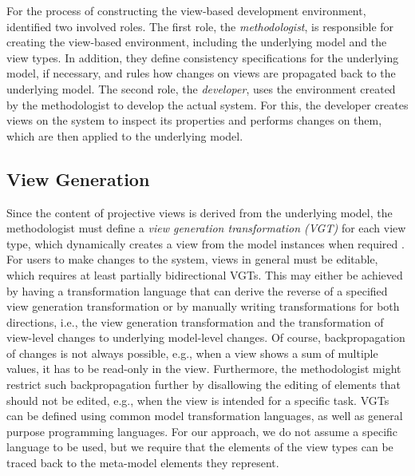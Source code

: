 For the process of constructing the view-based development environment, \textcite{atkinson_orthographic_2010} identified two involved roles.
The first role, the \emph{methodologist}, is responsible for creating the view-based environment, including the underlying model and the view types.
In addition, they define consistency specifications for the underlying model, if necessary, and rules how changes on views are propagated back to the underlying model.
The second role, the \emph{developer}, uses the environment created by the methodologist to develop the actual system.
For this, the developer creates views on the system to inspect its properties and performs changes on them, which are then applied to the underlying model.

\subsection{View Generation}
\label{sec:ViewGeneration}

Since the content of projective views is derived from the underlying model, the methodologist must define a \emph{view generation transformation (VGT)} for each view type, which dynamically creates a view from the model instances when required \autocite{tunjic_synchronization_2015}.
For users to make changes to the system, views in general must be editable, which requires at least partially bidirectional VGTs.
This may either be achieved by having a transformation language that can derive the reverse of a specified view generation transformation or by manually writing transformations for both directions, i.e., the view generation transformation and the transformation of view-level changes to underlying model-level changes.
Of course, backpropagation of changes is not always possible, e.g., when a view shows a sum of multiple values, it has to be read-only in the view.
Furthermore, the methodologist might restrict such backpropagation further by disallowing the editing of elements that should not be edited, e.g., when the view is intended for a specific task.
VGTs can be defined using common model transformation languages, as well as general purpose programming languages.
For our approach, we do not assume a specific language to be used, but we require that the elements of the view types can be traced back to the meta-model elements they represent.

